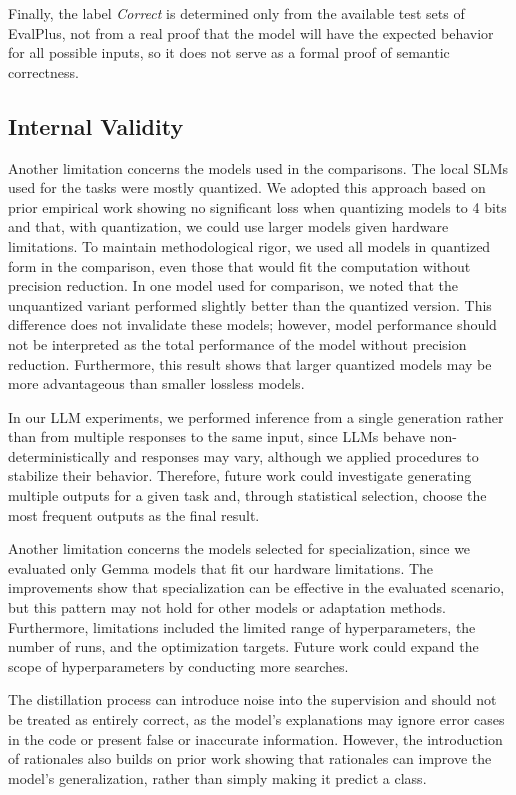Finally, the label \emph{Correct} is determined only from the available test sets of EvalPlus, not from a real proof that the model will have the expected behavior for all possible inputs, so it does not serve as a formal proof of semantic correctness.

\subsection{Internal Validity}

Another limitation concerns the models used in the comparisons. The local SLMs used for the tasks were mostly quantized. We adopted this approach based on prior empirical work showing no significant loss when quantizing models to 4 bits and that, with quantization, we could use larger models given hardware limitations. To maintain methodological rigor, we used all models in quantized form in the comparison, even those that would fit the computation without precision reduction. In one model used for comparison, we noted that the unquantized variant performed slightly better than the quantized version. This difference does not invalidate these models; however, model performance should not be interpreted as the total performance of the model without precision reduction. Furthermore, this result shows that larger quantized models may be more advantageous than smaller lossless models.

In our LLM experiments, we performed inference from a single generation rather than from multiple responses to the same input, since LLMs behave non-deterministically and responses may vary, although we applied procedures to stabilize their behavior. Therefore, future work could investigate generating multiple outputs for a given task and, through statistical selection, choose the most frequent outputs as the final result.

Another limitation concerns the models selected for specialization, since we evaluated only Gemma models that fit our hardware limitations. The improvements show that specialization can be effective in the evaluated scenario, but this pattern may not hold for other models or adaptation methods. Furthermore, limitations included the limited range of hyperparameters, the number of runs, and the optimization targets. Future work could expand the scope of hyperparameters by conducting more searches.

The distillation process can introduce noise into the supervision and should not be treated as entirely correct, as the model's explanations may ignore error cases in the code or present false or inaccurate information. However, the introduction of rationales also builds on prior work showing that rationales can improve the model's generalization, rather than simply making it predict a class.

